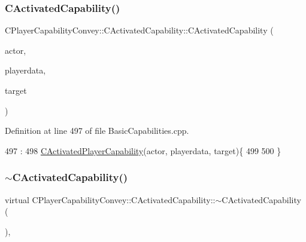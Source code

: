 \subsubsection{\texorpdfstring{C\+Activated\+Capability()}{CActivatedCapability()}}
{\footnotesize\ttfamily C\+Player\+Capability\+Convey\+::\+C\+Activated\+Capability\+::\+C\+Activated\+Capability (\begin{DoxyParamCaption}\item[{std\+::shared\+\_\+ptr$<$ \hyperlink{classCPlayerAsset}{C\+Player\+Asset} $>$}]{actor,  }\item[{std\+::shared\+\_\+ptr$<$ \hyperlink{classCPlayerData}{C\+Player\+Data} $>$}]{playerdata,  }\item[{std\+::shared\+\_\+ptr$<$ \hyperlink{classCPlayerAsset}{C\+Player\+Asset} $>$}]{target }\end{DoxyParamCaption})}



Definition at line 497 of file Basic\+Capabilities.\+cpp.


\begin{DoxyCode}
497                                                                                                            
                                                                               :
498 \hyperlink{classCActivatedPlayerCapability_a1ece00ffb6a7b925c84dd94a7407a0d1}{CActivatedPlayerCapability}(actor, playerdata, target)\{
499 
500 \}
\end{DoxyCode}
\hypertarget{classCPlayerCapabilityConvey_1_1CActivatedCapability_a10c78ea328de946070399c5596915641}{}\label{classCPlayerCapabilityConvey_1_1CActivatedCapability_a10c78ea328de946070399c5596915641} 
\subsubsection{\texorpdfstring{$\sim$\+C\+Activated\+Capability()}{~CActivatedCapability()}}
{\footnotesize\ttfamily virtual C\+Player\+Capability\+Convey\+::\+C\+Activated\+Capability\+::$\sim$\+C\+Activated\+Capability (\begin{DoxyParamCaption}{ }\end{DoxyParamCaption})\hspace{0.3cm}{\ttfamily [inline]}, {\ttfamily [virtual]}}



